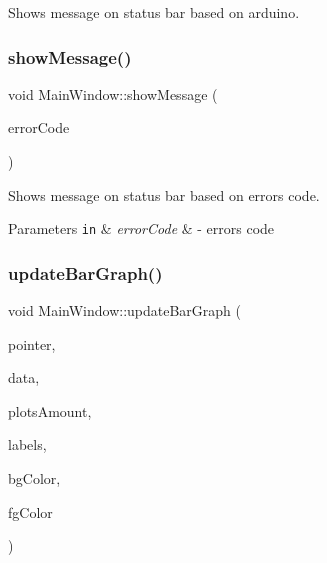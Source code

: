 Shows message on status bar based on arduino. 

\mbox{\label{class_main_window_a365152de4a1878ab0087816da6a9431a}} 
\subsubsection{show\+Message()\hspace{0.1cm}{\footnotesize\ttfamily [2/2]}}
{\footnotesize\ttfamily void Main\+Window\+::show\+Message (\begin{DoxyParamCaption}\item[{const quint32}]{error\+Code }\end{DoxyParamCaption})\hspace{0.3cm}{\ttfamily [private]}}



Shows message on status bar based on error\textquotesingle{}s code. 


\begin{DoxyParams}[1]{Parameters}
\mbox{\tt in}  & {\em error\+Code} & -\/ error\textquotesingle{}s code \\
\hline
\end{DoxyParams}
\mbox{\label{class_main_window_a1e61f5c68914afa9a1054cbb9982cf17}} 
\subsubsection{update\+Bar\+Graph()}
{\footnotesize\ttfamily void Main\+Window\+::update\+Bar\+Graph (\begin{DoxyParamCaption}\item[{Q\+Custom\+Plot $\ast$}]{pointer,  }\item[{const Q\+Vector$<$ double $>$ \&}]{data,  }\item[{const quint32 \&}]{plots\+Amount,  }\item[{const Q\+Vector$<$ Q\+String $>$ \&}]{labels,  }\item[{const Q\+Color \&}]{bg\+Color,  }\item[{const Q\+Color \&}]{fg\+Color }\end{DoxyParamCaption})\hspace{0.3cm}{\ttfamily [private]}}



